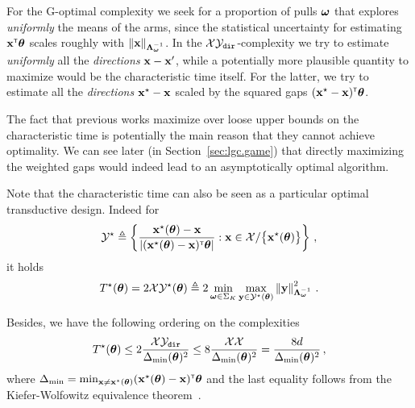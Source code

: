 For the G-optimal complexity we seek for a proportion of pulls ${\boldsymbol \omega}$ that explores \emph{uniformly} the means of the arms, since the statistical uncertainty for estimating ${\bf x}^\mathsf{\scriptscriptstyle T}{\boldsymbol \theta}$ scales roughly with $\left\lVert{\bf x}\right\rVert_{{\boldsymbol \Lambda}_{{\boldsymbol \omega}}^{-1}}$. In the $\mathcal{X}\mathcal{Y}_{\texttt{dir}}$-complexity we try to estimate \emph{uniformly} all the \emph{directions} ${\bf x}-{\bf x}'$, while a potentially more plausible quantity to maximize would be the characteristic time itself. For the latter, we try to estimate all the \emph{directions} ${\bf x}^\star - {\bf x}$ scaled by the squared gaps $({\bf x}^\star - {\bf x})^\mathsf{\scriptscriptstyle T}{\boldsymbol \theta}$. 

The fact that previous works maximize over loose upper bounds on the characteristic time is potentially the main reason that they cannot achieve optimality. We can see later (in Section~\ref{sec:lgc.game}) that directly maximizing the weighted gaps would indeed lead to an asymptotically optimal algorithm.

Note that the characteristic time can also be seen as a particular optimal transductive design. Indeed for 
\[
    \mathcal{Y}^\star \triangleq \left\{ \frac{{\bf x}^\star({\boldsymbol \theta})- {\bf x}}{\left|({\bf x}^\star({\boldsymbol \theta})- {\bf x})^\mathsf{\scriptscriptstyle T}{\boldsymbol \theta}\right|}: {\bf x}\in\mathcal{X}/\big\{{\bf x}^\star({\boldsymbol \theta})\big\}  \right\}\,,
\]
it holds
\[
    T^{\star}({\boldsymbol \theta}) = 2 \mathcal{X}\mathcal{Y}^\star({\boldsymbol \theta}) \triangleq 2 \min_{{\boldsymbol \omega}\in\Sigma_K} \max_{{\bf y}\in\mathcal{Y}^\star({\boldsymbol \theta})} \left\lVert{\bf y}\right\rVert_{{\boldsymbol \Lambda}_{{\boldsymbol \omega}}^{-1}}^2\,.
\]

Besides, we have the following ordering on the complexities
\begin{align}\label{eq:lgc.complexities}
    T^{\star}({\boldsymbol \theta}) \leq 2 \frac{\mathcal{X}\mathcal{Y}_{\texttt{dir}}}{\Delta_\text{min}({\boldsymbol \theta})^2}\leq 8 \frac{\mathcal{X}\mathcal{X}}{\Delta_\text{min}({\boldsymbol \theta})^2} = \frac{8d}{\Delta_\text{min}({\boldsymbol \theta})^2}\,,
\end{align}
where $\Delta_\text{min} = \min_{{\bf x}\neq{\bf x}^\star({\boldsymbol \theta})}({\bf x}^\star({\boldsymbol \theta})- {\bf x})^\mathsf{\scriptscriptstyle T}{\boldsymbol \theta}$ and the last equality follows from the Kiefer-Wolfowitz equivalence theorem~\citep{kiefer1959}. 


